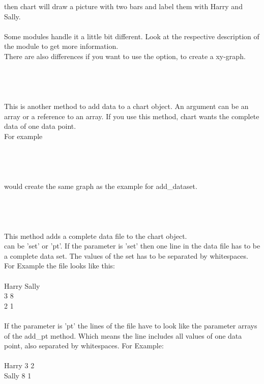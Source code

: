then chart will draw a picture with two bars and label them with Harry and Sally.\\ \\
Some modules handle it a little bit different. Look at the respective description of the module to get more information.\\
There are also differences if you want to use the  option, to create a xy-graph. \\
\\
\\
 \\ \\
This is another method to add data to a chart object. An argument can be an array or a reference to an array. If you use this method, chart wants the complete data of one data point.\\
For example\\
\\
\\ 
\\
\\
would create the same graph as the example for add\_dataset.\\
\\
\\
 \\
 \\
This method adds a complete data file to the chart object.\\
 can be 'set' or 'pt'. If the parameter is 'set' then one line in the data file has to be a complete data set. The values of the set has to be separated by whitespaces. For Example the file looks like this:\\
\\
Harry  Sally\\
3      8\\
2      1\\
\\
If the parameter is 'pt' the lines of the file have to look like the parameter arrays of the add\_pt method. Which means the line includes all values of one data point, also separated by whitespaces. For Example:\\
\\
Harry 3 2\\
Sally 8 1\\
